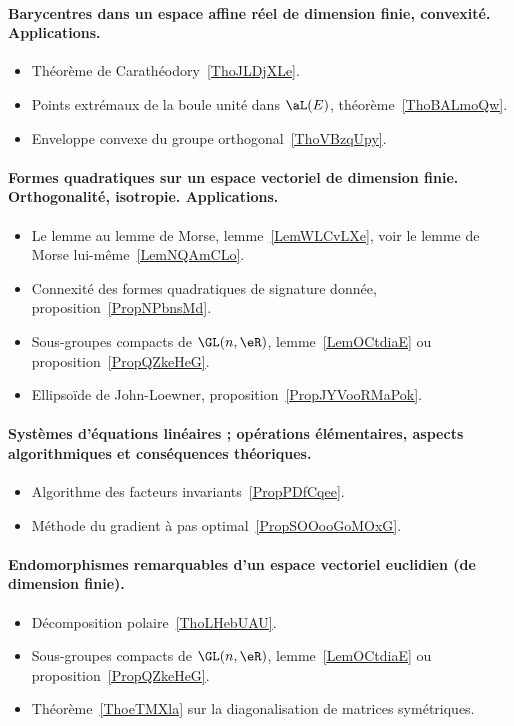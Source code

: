 \paragraph{Barycentres dans un espace affine réel de dimension finie, convexité. Applications.}
\begin{itemize}
    \item Théorème de Carathéodory~\ref{ThoJLDjXLe}.
    \item Points extrémaux de la boule unité dans \( \aL(E)\), théorème~\ref{ThoBALmoQw}.
    \item Enveloppe convexe du groupe orthogonal~\ref{ThoVBzqUpy}.
\end{itemize}
\paragraph{Formes quadratiques sur un espace vectoriel de dimension finie. Orthogonalité, isotropie. Applications.}
\begin{itemize}
    \item Le lemme au lemme de Morse, lemme~\ref{LemWLCvLXe}, voir le lemme de Morse lui-même~\ref{LemNQAmCLo}.
    \item Connexité des formes quadratiques de signature donnée, proposition~\ref{PropNPbnsMd}.
    \item Sous-groupes compacts de \( \GL(n,\eR)\), lemme~\ref{LemOCtdiaE} ou proposition~\ref{PropQZkeHeG}.
    \item Ellipsoïde de John-Loewner, proposition~\ref{PropJYVooRMaPok}.
\end{itemize}
\paragraph{Systèmes d'équations linéaires ; opérations élémentaires, aspects algorithmiques et conséquences théoriques.}
\begin{itemize}
    \item Algorithme des facteurs invariants~\ref{PropPDfCqee}.
    \item Méthode du gradient à pas optimal~\ref{PropSOOooGoMOxG}.
\end{itemize}
\paragraph{Endomorphismes remarquables d’un espace vectoriel euclidien (de dimension finie).}
\begin{itemize}
    \item Décomposition polaire~\ref{ThoLHebUAU}.
    \item Sous-groupes compacts de \( \GL(n,\eR)\), lemme~\ref{LemOCtdiaE} ou proposition~\ref{PropQZkeHeG}.
    \item Théorème~\ref{ThoeTMXla} sur la diagonalisation de matrices symétriques.
\end{itemize}
